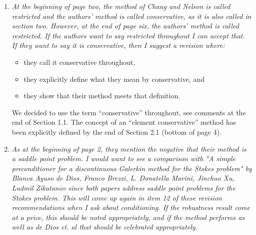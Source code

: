 \documentclass[11pt,c]{article}
\begin{document}
\begin{enumerate}

  \item {\em At the beginning of page two, the method of Chang and Nelson is called restricted 
and the authors' method is called conservative, as it is also called in section two.  However, 
at the end of page six, the authors' method is called restricted.  If the authors want to say 
restricted throughout I can accept that.  If they want to say it is conservative, then I suggest 
a revision where:
\begin{itemize}
  \item they call it conservative throughout,
  \item they explicitly define what they mean by conservative, and
  \item they show that their method meets that definition.
\end{itemize}
}

We decided to use the term ``conservative'' throughout, see comments at the end 
of Section 1.1. The concept of an ``element conservative'' method has been 
explicitly defined by the end of Section 2.1 (bottom of page 4).



  \item {\em As at the beginning of page 2, they mention the negative that their method is 
a saddle point problem.  I would want to see a comparison with "A simple preconditioner for a 
discontinuous Galerkin method for the Stokes problem" by Blanca Ayuso de Dios, Franco Brezzi, 
L. Donatella Marini, Jinchao Xu, Ludmil Zikatanov since both papers address saddle point problems 
for the Stokes problem.  This will come up again in item 12 of these revision recommendations 
when I ask about conditioning.  If the robustness result come at a price, this should be 
noted appropriately, and if the method performs as well as de Dios et. al that should be 
celebrated appropriately.}


\end{enumerate}
\end{document}
